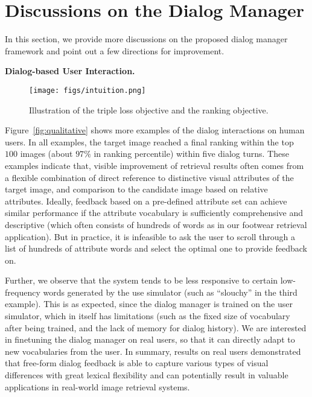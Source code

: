\section{Discussions on the Dialog Manager}
\label{sec:qualitative}
In this section, we provide more discussions on the proposed dialog 
manager framework and point out a few directions for improvement. 

\textbf{Dialog-based User Interaction.} 

\begin{wrapfigure}{r}{7cm}
\centering
\texttt{[image: figs/intuition.png]}
\caption{Illustration of the triple loss objective and the ranking objective. }
\label{fig:intuition}
\end{wrapfigure}

Figure~\ref{fig:qualitative} shows more examples of the dialog interactions 
on human users. In all examples, the target image reached a final
ranking within the top $100$ images (about $97\%$ in ranking percentile) within
five dialog turns. These examples indicate that, visible 
improvement of retrieval results often comes from a flexible combination of 
direct reference to distinctive visual attributes of the target image, 
and comparison to the candidate image based on relative attributes. 
Ideally, feedback based on a pre-defined attribute set can achieve 
similar performance if the attribute vocabulary is sufficiently 
comprehensive and descriptive (which often consists of hundreds of 
words as in our footwear retrieval application). 
But in practice, it is infeasible to ask the user to scroll through a list of 
hundreds of attribute words and select the optimal one to provide feedback on. 



Further, we observe that the system tends to be less responsive to 
certain low-frequency words generated by the use simulator (such as 
``slouchy'' in the third example). This is as expected, since the dialog manager 
is trained on the user simulator, which in itself has limitations
(such as the fixed size of vocabulary after being trained, and the lack of memory for
dialog history). We are interested in finetuning the dialog manager on 
real users, so that it can directly adapt to new vocabularies from the user. 
In summary, results on real users demonstrated that free-form dialog feedback 
is able to capture various types of visual differences with great 
lexical flexibility and can potentially result in valuable applications
in real-world image retrieval systems. 

